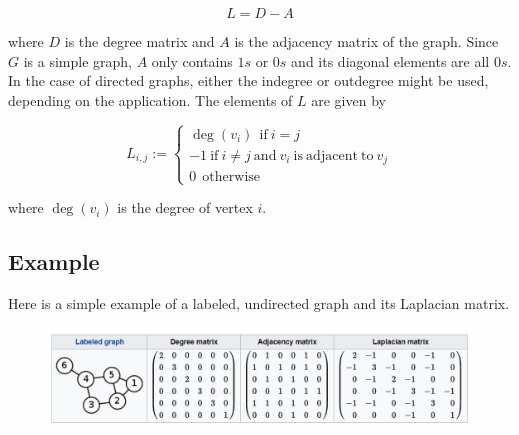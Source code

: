 \begin{equation}
L = D - A
\end{equation}

where $ D $ is the degree matrix and $ A $ is the adjacency matrix of the graph.
Since $ G $ is a simple graph, $ A $ only contains $ 1s $ or $ 0s $ and its diagonal elements are all $ 0s $.
In the case of directed graphs, either the indegree or outdegree might be used, depending on the application.
The elements of $ L $ are given by

\begin{equation}
L_{i,j} := \begin{cases}
\deg(v_i)~~\mathrm{if}~i= j \\
-1 \: \mathrm{if}~i \neq j~\mathrm{and}~v_i~\mathrm{is~adjacent~to}~v_j \\
0~~\mathrm{otherwise}
\end{cases}
\end{equation}

where $ \deg(v_i) $ is the degree of vertex $ i $.

\subsection{Example}
Here is a simple example of a labeled, undirected graph and its Laplacian matrix.

\begin{figure}[h]
\centering
\includegraphics[width=0.8\linewidth]{Figures/example_laplacian_matrix}
\caption{}
\label{fig:example_laplacian_matrix}
\end{figure}
